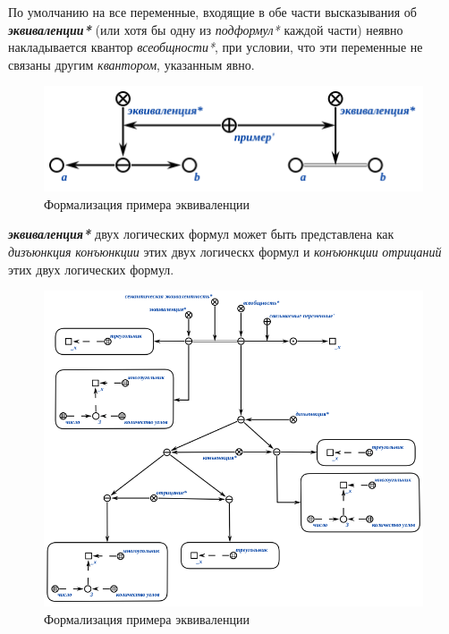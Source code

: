 По умолчанию на все переменные, входящие в обе части высказывания об \textbf{\textit{эквиваленции*}} (или хотя бы одну из \textit{подформул*} каждой части) неявно накладывается квантор \textit{всеобщности*}, при условии, что эти переменные не связаны другим \textit{квантором}, указанным явно.

\begin{figure}[http]
	\includegraphics[scale=0.8]{author/part2/figures/logic/equivalent.png}
	\caption{Формализация примера эквиваленции}
	\label{fig:equivalent}
\end{figure}

\textbf{\textit{эквиваленция*}} двух логических формул может быть представлена как \textit{дизъюнкция} \textit{конъюнкции} этих двух логическх формул и \textit{конъюнкции} \textit{отрицаний} этих двух логических формул.

\begin{figure}[http]
	\includegraphics[scale=0.8]{author/part2/figures/logic/equivalence_representation.png}
	\caption{Формализация примера эквиваленции}
	\label{fig:equivalence_representation}
\end{figure}

\begin{SCn}
\end{SCn}

